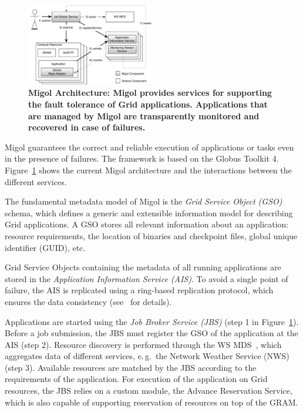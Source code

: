 \documentclass[times, 10pt, twocolumn]{article}
\newcommand{\up}{\vspace*{-1em}}
\begin{document}
\label{sec:migol}

\up
\begin{figure}[h]
 \centering
 \includegraphics[width=0.5\textwidth]{migol_architecture}
 \caption{\small \bf Migol Architecture: Migol provides services for
 supporting the fault tolerance of Grid applications. Applications that are managed by
 Migol are transparently monitored and recovered in case of
 failures.\up\up
 }
 \label{fig:migol_architecture} 
\end{figure}           


Migol guarantees the correct and reliable exe\-cution of applications
or tasks even in the presence of failures. The framework is based on
the Globus Toolkit 4.  Figure~\ref{fig:migol_architecture} shows the
current Migol architecture and the interactions between the different
services.

The fundamental metadata model of Migol is the \emph{Grid Service
  Object (GSO)} schema, which defines a generic and extensible
information model for describing Grid applications.
A GSO stores all relevant information about an application: resource
requirements, the location of binaries and checkpoint files, global
unique identifier (GUID), etc.

Grid Service Objects containing the metadata of all running
applications are stored in the {\em Application Information Service
  (AIS)}.
To avoid a single point of failure, the AIS is replicated using a ring-based
replication protocol, which ensures the data consistency
(see~\cite{Luckow:2008ys} for details).

Applications are started using the {\em Job Broker Service (JBS)}
(step 1 in Figure~\ref{fig:migol_architecture}). Before a job
submission, the JBS must register the GSO of the application at the
AIS (step 2).  Resource discovery is performed through the WS
MDS~\cite{schopf06}, which aggregates data of different services,
e.\,g.\ the Network Weather Service (NWS)~\cite{NWS99} (step 3).
Available resources are matched by the JBS according to the
requirements of the application. For execution of the application on
Grid resources, the JBS relies on a custom module, the Advance
Reservation Service, which is also capable of supporting reservation
of resources on top of the GRAM.
\end{document}
